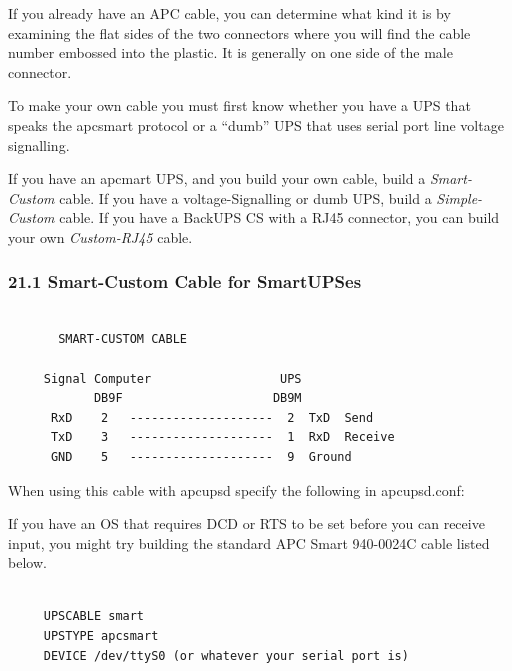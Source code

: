If you already have an APC cable, you can determine what kind it is by
examining the flat sides of the two connectors where you will find the cable
number embossed into the plastic. It is generally on one side of the male
connector.  

To make your own cable you must first know whether you have a UPS that speaks
the apcsmart protocol or a ``dumb'' UPS that uses serial port line voltage
signalling.  

If you have an apcmart UPS, and you build your own cable, build a {\it
Smart-Custom} cable. If you have a voltage-Signalling or dumb UPS, build a
{\it Simple-Custom} cable. If you have a BackUPS CS with a RJ45 connector, you
can build your own {\it Custom-RJ45} cable. 

\label{Smart_002dCustom-Cable-for-SmartUPSes}

\subsubsection*{21.1 Smart-Custom Cable for SmartUPSes}

\label{index-Smart-Custom-Cable-192}
\label{index-Cables_002c-Smart-Custom-193}

\footnotesize
\begin{verbatim}
     
       SMART-CUSTOM CABLE
     
     Signal Computer                  UPS
            DB9F                     DB9M
      RxD    2   --------------------  2  TxD  Send
      TxD    3   --------------------  1  RxD  Receive
      GND    5   --------------------  9  Ground
\end{verbatim}
\normalsize

When using this cable with apcupsd specify the following in apcupsd.conf:  

If you have an OS that requires DCD or RTS to be set before you can receive
input, you might try building the standard APC Smart 940-0024C cable listed
below. 

\footnotesize
\begin{verbatim}
     
     UPSCABLE smart
     UPSTYPE apcsmart
     DEVICE /dev/ttyS0 (or whatever your serial port is)
\end{verbatim}
\normalsize


